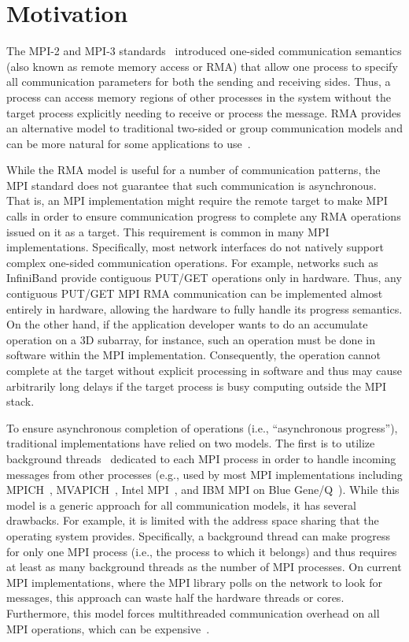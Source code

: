 \section{Motivation}

The MPI-2 and MPI-3 standards~\cite{mpi30-report} introduced one-sided
communication semantics (also known as remote memory access or RMA)
that allow one process to specify all communication parameters for
both the sending and receiving sides.  Thus, a process can access
memory regions of other processes in the system without the target
process explicitly needing to receive or process the message.  RMA
provides an alternative model to traditional two-sided or group
communication models and can be more natural for some applications to
use~\cite{dinan12:armci_mpi}.

While the RMA model is useful for a number of communication patterns,
the MPI standard does not guarantee that such communication is
asynchronous.  That is, an MPI implementation might require
the remote target to make MPI calls in order to ensure communication
progress to complete any RMA operations issued on it as a target.
This requirement is common in many MPI implementations.
Specifically, most network interfaces do not natively support complex
one-sided communication operations.  For example, networks such as
InfiniBand provide contiguous PUT\slash GET operations only in
hardware.  Thus, any contiguous PUT\slash GET MPI RMA communication
can be implemented almost entirely in hardware, allowing the hardware
to fully handle its progress semantics.  On the other hand, if the
application developer wants to do an accumulate operation on a 3D
subarray, for instance, such an operation must be done in software
within the MPI implementation.  Consequently, the operation cannot
complete at the target without explicit processing in software and
thus may cause arbitrarily long delays if the target process is busy
computing outside the MPI stack.

To ensure asynchronous completion of operations (i.e., ``asynchronous
progress''), traditional implementations have relied on two models.
The first is to utilize background threads~\cite{mpi2-thread}
dedicated to each MPI process in order to handle incoming messages
from other processes (e.g., used by most MPI implementations including
MPICH~\cite{mpich}, MVAPICH~\cite{mvapich}, Intel MPI~\cite{intelmpi},
and IBM MPI on Blue Gene/Q~\cite{bgq-mpi}). While this model is a
generic approach for all communication models, it has several drawbacks.
For example, it is limited with the address space sharing that the operating system
provides.  Specifically, a background thread can make progress
for only one MPI process (i.e., the process to which it belongs) and thus
requires at least as many background threads as the number of MPI
processes.  On current MPI implementations, where the MPI library
polls on the network to look for messages, this approach can waste half the
hardware threads or cores.  Furthermore, this model forces
multithreaded communication overhead on all MPI operations, which can
be expensive~\cite{thread-safety}.

